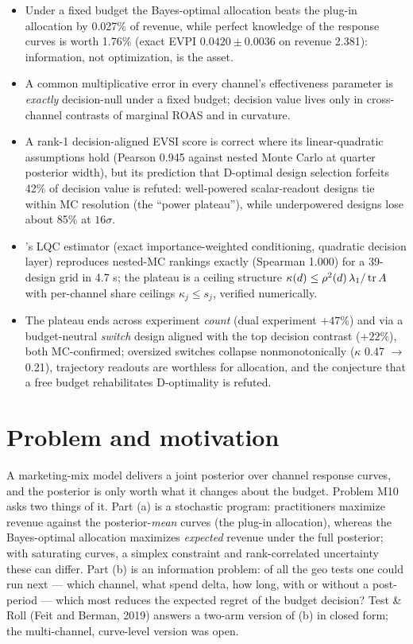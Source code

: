 \begin{keyideas}
\begin{itemize}
\item Under a fixed budget the Bayes-optimal allocation beats the plug-in allocation by 0.027\% of revenue, while perfect knowledge of the response curves is worth 1.76\% (exact EVPI $0.0420 \pm 0.0036$ on revenue 2.381): information, not optimization, is the asset.
\item A common multiplicative error in every channel's effectiveness parameter is \emph{exactly} decision-null under a fixed budget; decision value lives only in cross-channel contrasts of marginal ROAS and in curvature.
\item A rank-1 decision-aligned EVSI score is correct where its linear-quadratic assumptions hold (Pearson 0.945 against nested Monte Carlo at quarter posterior width), but its prediction that D-optimal design selection forfeits 42\% of decision value is refuted: well-powered scalar-readout designs tie within MC resolution (the ``power plateau''), while underpowered designs lose about 85\% at $16\sigma$.
\item {}'s LQC estimator (exact importance-weighted conditioning, quadratic decision layer) reproduces nested-MC rankings exactly (Spearman 1.000) for a 39-design grid in 4.7 s; the plateau is a ceiling structure $\kappa(d) \le \rho^2(d)\,\lambda_1/\operatorname{tr} A$ with per-channel share ceilings $\kappa_j \le s_j$, verified numerically.
\item The plateau ends across experiment \emph{count} (dual experiment $+47\%$) and via a budget-neutral \emph{switch} design aligned with the top decision contrast ($+22\%$), both MC-confirmed; oversized switches collapse nonmonotonically ($\kappa$ 0.47 $\to$ 0.21), trajectory readouts are worthless for allocation, and the conjecture that a free budget rehabilitates D-optimality is refuted.
\end{itemize}
\end{keyideas}

\section{Problem and motivation}

A marketing-mix model delivers a joint posterior over channel response curves, and the posterior is only worth what it changes about the budget. Problem M10 asks two things of it. Part (a) is a stochastic program: practitioners maximize revenue against the posterior-\emph{mean} curves (the plug-in allocation), whereas the Bayes-optimal allocation maximizes \emph{expected} revenue under the full posterior; with saturating curves, a simplex constraint and rank-correlated uncertainty these can differ. Part (b) is an information problem: of all the geo tests one could run next --- which channel, what spend delta, how long, with or without a post-period --- which most reduces the expected regret of the budget decision? Test \& Roll (Feit and Berman, 2019) answers a two-arm version of (b) in closed form; the multi-channel, curve-level version was open.

